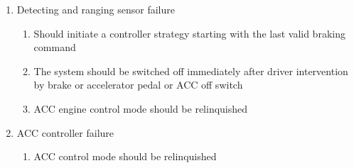 \begin{enumerate}
\begin{enumerate}[label*=\arabic*]
\begin{enumerate}[label*=\arabic*]
       \end{enumerate}
       \item{Detecting and ranging sensor failure}
       \begin{enumerate}[label*=\arabic*]
           \item{Should initiate a controller strategy starting with the last valid braking command}
           \item{The system should be switched off immediately after driver intervention by brake or accelerator pedal or ACC off switch}
           \item{ACC engine control mode should be relinquished}
       \end{enumerate}
       \item{ACC controller failure}
       \begin{enumerate}[label*=\arabic*]
           \item{ACC control mode should be relinquished}
       \end{enumerate}
    \end{enumerate}
\end{enumerate}
\newpage





